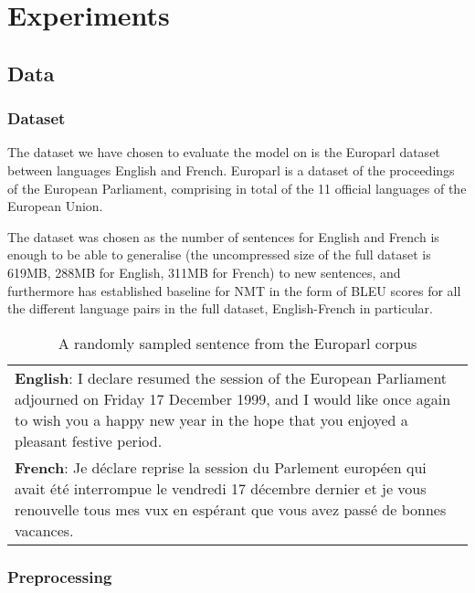 \chapter{Experiments}
\label{ExperimentsCh}

\section{Data}

\subsection{Dataset}

The dataset we have chosen to evaluate the model on is the Europarl dataset
between languages English and French. Europarl is a dataset of the proceedings
of the European Parliament, comprising in total of the 11 official languages of
the European Union.

The dataset was chosen as the number of sentences for English and French is
enough to be able to generalise (the uncompressed size of the full dataset is
619MB, 288MB for English, 311MB for French) to new sentences, and furthermore has
established baseline for NMT in the form of BLEU scores for all the different
language pairs in the full dataset, English-French in
particular.\cite{koehn2005epc}

\begin{table}[t]
  \begin{center}
    \begin{tabular}{ |p{}| } 
      \hline
      \textbf{English}: I declare resumed the session of the European Parliament adjourned on Friday 17 December 1999, and I would like once again to wish you a happy new year in the hope that you enjoyed a pleasant festive period.\\
      \textbf{French}: Je déclare reprise la session du Parlement européen qui avait été interrompue le vendredi 17 décembre dernier et je vous renouvelle tous mes vux en espérant que vous avez passé de bonnes vacances.\\
      \hline
    \end{tabular}
    \caption{A randomly sampled sentence from the Europarl corpus}
  \end{center}
\end{table}

\subsection{Preprocessing}

